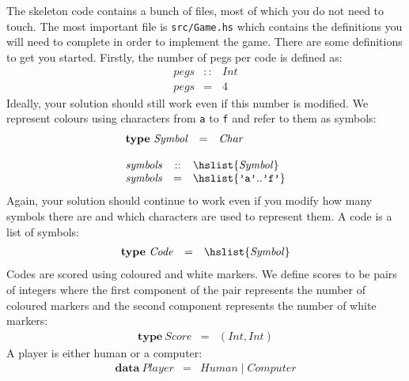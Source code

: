\documentclass{cs256-shared/cs256}
\begin{document}
The skeleton code contains a bunch of files, most of which you do not need to touch. The most important file is \texttt{src/Game.hs} which contains the definitions you will need to complete in order to implement the game. There are some definitions to get you started. Firstly, the number of pegs per code is defined as:
\begin{displaymath}
\begin{array}{lcl}
\mathit{pegs} & :: & \mathit{Int} \\
\mathit{pegs} & = & 4
\end{array}
\end{displaymath}
Ideally, your solution should still work even if this number is modified. We represent colours using characters from \texttt{a} to \texttt{f} and refer to them as symbols:
\begin{displaymath}
\begin{array}{l}
\begin{array}{lcl}
\mathbf{type}~\mathit{Symbol} & = & \mathit{Char}
\end{array} \\\\
\begin{array}{lcl}
\mathit{symbols} & :: & \hslist{\mathit{Symbol}} \\
\mathit{symbols} & = & \hslist{\texttt{'a'}..\texttt{'f'}}
\end{array}
\end{array}
\end{displaymath}
Again, your solution should continue to work even if you modify how many symbols there are and which characters are used to represent them. A code is a list of symbols:
\begin{displaymath}
\begin{array}{lcl}
\mathbf{type}~\mathit{Code} & = & \hslist{\mathit{Symbol}}
\end{array}
\end{displaymath}
Codes are scored using coloured and white markers. We define scores to be pairs of integers where the first component of the pair represents the number of coloured markers and the second component represents the number of white markers:
\begin{displaymath}
\begin{array}{lcl}
\mathbf{type}~\mathit{Score} & = & (\mathit{Int}, \mathit{Int})
\end{array}
\end{displaymath}
A player is either human or a computer:
\begin{displaymath}
\begin{array}{lcl}
\mathbf{data}~\mathit{Player} & = & \mathit{Human} \mid \mathit{Computer}
\end{array}
\end{displaymath}
\end{document}
